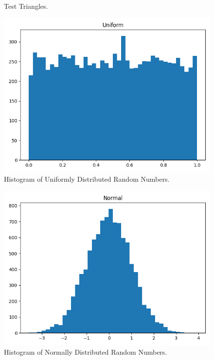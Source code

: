 \documentclass{article}
\begin{document}
\begin{figure}[ht!]
\begin{center}
\begin{tabular}{cc}
\end{tabular}
\end{center}
\caption{Test Triangles.}
\end{figure}
\pagebreak

\begin{figure}[ht!]
\begin{center}
\includegraphics[width=4.5in]{UniformPlot.png} 
\caption{Histogram of Uniformly Distributed Random Numbers.}
\end{center}
\end{figure}

\begin{figure}[ht!]
\begin{center}
\includegraphics[width=4.5in]{NormalPlot.png} 
\caption{Histogram of Normally Distributed Random Numbers.}
\end{center}
\end{figure}
\end{document}
